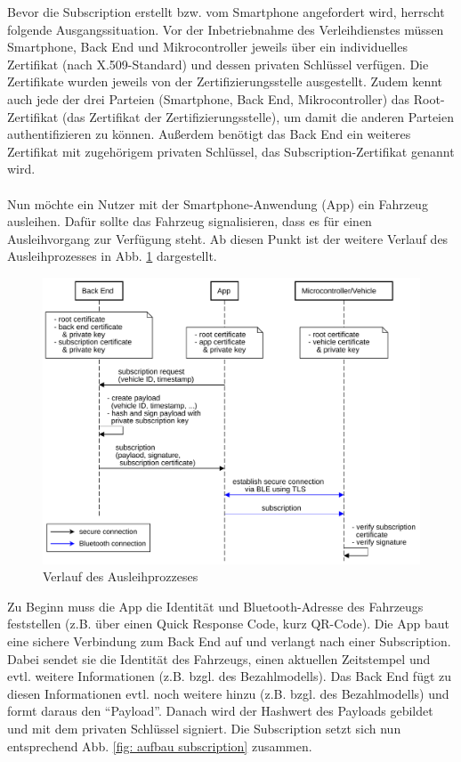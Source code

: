 Bevor die Subscription erstellt bzw. vom Smartphone angefordert wird, herrscht folgende Ausgangssituation. Vor der Inbetriebnahme des Verleihdienstes müssen Smartphone, Back End und Mikrocontroller jeweils über ein individuelles Zertifikat (nach X.509-Standard) und dessen privaten Schlüssel verfügen. Die Zertifikate wurden jeweils von der Zertifizierungsstelle ausgestellt. Zudem kennt auch jede der drei Parteien (Smartphone, Back End, Mikrocontroller) das Root-Zertifikat (das Zertifikat der Zertifizierungsstelle), um damit die anderen Parteien authentifizieren zu können. Außerdem benötigt das Back End ein weiteres Zertifikat mit zugehörigem privaten Schlüssel, das Subscription-Zertifikat genannt wird.
\\\\
Nun möchte ein Nutzer mit der Smartphone-Anwendung (App) ein Fahrzeug ausleihen. Dafür sollte das Fahrzeug signalisieren, dass es für einen Ausleihvorgang zur Verfügung steht. Ab diesen Punkt ist der weitere Verlauf des Ausleihprozesses in Abb. \ref{fig: verlauf ausleihprozess} dargestellt.
\begin{figure}[H]
    \centering
    \includegraphics[width=1\textwidth]{graphics/verlauf_ausleihprozess.pdf}
    \caption[Verlauf des Ausleihprozzeses]{Verlauf des Ausleihprozzeses}
    \label{fig: verlauf ausleihprozess}
\end{figure}
Zu Beginn muss die App die Identität und Bluetooth-Adresse des Fahrzeugs feststellen (z.B. über einen Quick Response Code, kurz QR-Code). Die App baut eine sichere Verbindung zum Back End auf und verlangt nach einer Subscription. Dabei sendet sie die Identität des Fahrzeugs, einen aktuellen Zeitstempel und evtl. weitere Informationen (z.B. bzgl. des Bezahlmodells). Das Back End fügt zu diesen Informationen evtl. noch weitere hinzu (z.B. bzgl. des Bezahlmodells) und formt daraus den "`Payload"'. Danach wird der Hashwert des Payloads gebildet und mit dem privaten Schlüssel signiert. Die Subscription setzt sich nun entsprechend Abb. \ref{fig: aufbau subscription} zusammen.
